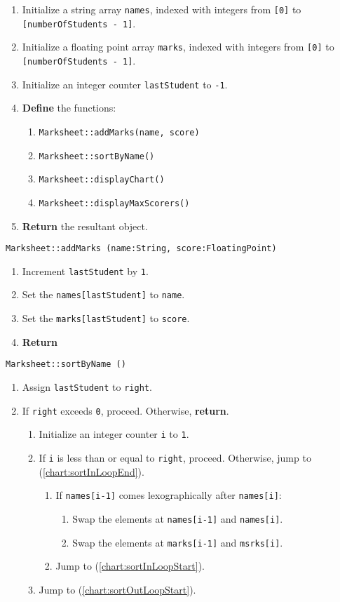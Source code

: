 \begin{enumerate}
	\item	Initialize a string array {\tt names}, indexed with integers from {\tt [0]} to {\tt [numberOfStudents - 1]}.
	\item	Initialize a floating point array {\tt marks}, indexed with integers from {\tt [0]} to 
			{\tt [numberOfStudents - 1]}.
	\item	Initialize an integer counter {\tt lastStudent} to {\tt -1}.
	\item	{\bf Define} the functions: 
	\begin{enumerate}
		\item	{\tt Marksheet::addMarks(name, score)}
		\item	{\tt Marksheet::sortByName()}
		\item	{\tt Marksheet::displayChart()}
		\item	{\tt Marksheet::displayMaxScorers()}
	\end{enumerate}
	\item	{\bf Return} the resultant object.
\end{enumerate}
\vspace{5mm}
{\tt Marksheet::addMarks (name:String, score:FloatingPoint)}
\begin{enumerate}
	\item	Increment {\tt lastStudent} by {\tt 1}.
	\item	Set the {\tt names[lastStudent]} to {\tt name}.
	\item	Set the {\tt marks[lastStudent]} to {\tt score}.
	\item	{\bf Return}
\end{enumerate}
\vspace{5mm}
{\tt Marksheet::sortByName ()}
\begin{enumerate}
	\item	Assign {\tt lastStudent} to {\tt right}.
	\item	If {\tt right} exceeds {\tt 0}, proceed.
			Otherwise, {\bf return}. \label{chart:sortOutLoopStart}
		\begin{enumerate}
			\item	Initialize an integer counter {\tt i} to {\tt 1}.
			\item	If {\tt i} is less than or equal to {\tt right}, proceed.
					Otherwise, jump to (\ref{chart:sortInLoopEnd}). \label{chart:sortInLoopStart}
			\begin{enumerate}
				\item	If {\tt names[i-1]} comes lexographically after {\tt names[i]}:
				\begin{enumerate}
					\item	Swap the elements at {\tt names[i-1]} and {\tt names[i]}.
					\item	Swap the elements at {\tt marks[i-1]} and {\tt msrks[i]}.
				\end{enumerate}
				\item	Jump to (\ref{chart:sortInLoopStart}).
			\end{enumerate}
			\item	Jump to (\ref{chart:sortOutLoopStart}). \label{chart:sortInLoopEnd}
		\end{enumerate}
\end{enumerate}
